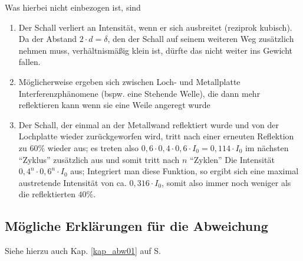Was hierbei nicht einbezogen ist, sind
\begin{enumerate}
\sloppy   
   \item Der Schall verliert an Intensität, wenn er sich ausbreitet (reziprok kubisch). Da der Abstand \(2 \cdot d = \delta\), den der Schall auf seinem weiteren Weg zusätzlich  nehmen muss, verhältnismäßig klein ist, dürfte das nicht weiter ins Gewicht fallen.
   
   \item Möglicherweise ergeben sich zwischen Loch- und Metallplatte Interferenzphänomene (bspw. eine Stehende Welle), die dann mehr reflektieren kann wenn sie eine Weile angeregt wurde
   
   \item Der Schall, der einmal an der Metallwand reflektiert wurde und von der Lochplatte wieder zurückgeworfen wird, tritt nach einer erneuten Reflektion zu \(60\%\) wieder aus; es treten also \(0,6 \cdot 0,4 \cdot 0,6 \cdot I_0 = 0,114 \cdot I_0\) im nächsten ``Zyklus'' zusätzlich aus und somit tritt nach \(n\) ``Zyklen'' Die Intensität \(0,4^n \cdot 0,6^n \cdot I_0\) aus; Integriert man diese Funktion, so ergibt sich eine maximal austretende Intensität von ca. \(0,316 \cdot I_0\), somit also immer noch weniger als die reflektierten \(40\%\).
\end{enumerate}




\subsection{Mögliche Erklärungen für die Abweichung}
\label{kap_abw02}

Siehe hierzu auch Kap. \ref{kap_abw01} auf S. \pageref{kap_abw01}

